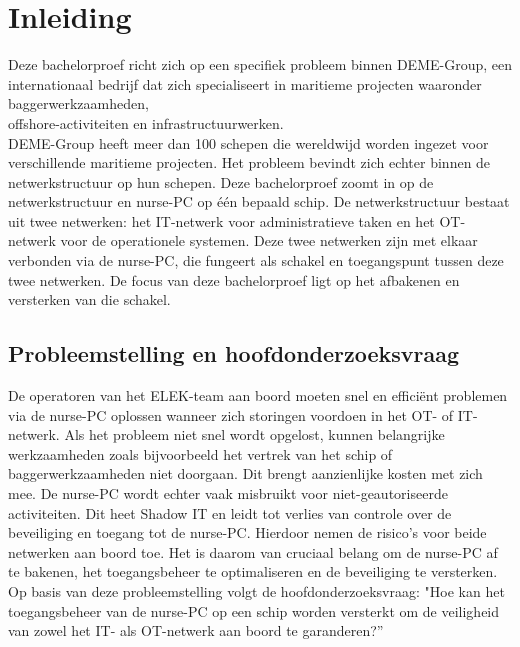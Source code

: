 


% 

\section{Inleiding}%
\label{sec:inleiding}
Deze bachelorproef richt zich op een specifiek probleem binnen DEME-Group, een internationaal bedrijf dat zich specialiseert in maritieme projecten waaronder 
baggerwerkzaamheden, \\offshore-activiteiten en infrastructuurwerken. \\DEME-Group heeft meer dan 100 schepen die wereldwijd worden ingezet voor verschillende maritieme projecten. Het probleem 
bevindt zich echter binnen de netwerkstructuur op hun schepen. Deze bachelorproef zoomt in op de netwerkstructuur en nurse-PC op één bepaald schip. De netwerkstructuur bestaat uit twee netwerken: het IT-netwerk voor administratieve taken 
en het OT-netwerk voor de operationele systemen. Deze twee netwerken zijn met elkaar verbonden via de nurse-PC, 
die fungeert als schakel en toegangspunt tussen deze twee netwerken. De focus van deze bachelorproef ligt op het afbakenen en versterken van die schakel.

\subsection{Probleemstelling en hoofdonderzoeksvraag}
De operatoren van het ELEK-team aan boord moeten snel en efficiënt problemen via de nurse-PC oplossen wanneer zich storingen voordoen in het OT- of IT-netwerk.  
Als het probleem niet snel wordt opgelost, kunnen belangrijke werkzaamheden zoals bijvoorbeeld het vertrek van het schip of baggerwerkzaamheden niet doorgaan. 
Dit brengt aanzienlijke kosten met zich mee. De nurse-PC wordt echter vaak misbruikt voor niet-geautoriseerde activiteiten. Dit heet Shadow IT en leidt tot verlies van controle 
over de beveiliging en toegang tot de nurse-PC. Hierdoor nemen de risico’s voor beide netwerken aan boord toe. Het is daarom van cruciaal belang om de nurse-PC af 
te bakenen, het toegangsbeheer te optimaliseren en de beveiliging te versterken. Op basis van deze probleemstelling volgt de hoofdonderzoeksvraag: 
"Hoe kan het toegangsbeheer van de nurse-PC op een schip worden versterkt om de veiligheid van zowel het IT- als OT-netwerk aan boord te garanderen?” 

